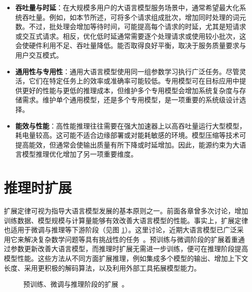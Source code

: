 \begin{itemize}
\item \vspace{0.5em} \textbf{吞吐量与时延}：在大规模多用户的大语言模型服务场景中，通常希望最大化系统吞吐量。例如，如本节所述，可将多个请求组成批次，增加同时处理的词元数。不过，批处理会增加等待时间，可能提高每个请求的时延，尤其是短请求或交互式请求。相反，优化低时延通常需要逐个处理请求或使用较小批次，这会使硬件利用不足、吞吐量降低。能否取得良好平衡，取决于服务质量要求与用户交互模式。
\item \vspace{0.3cm} \textbf{通用性与专用性}：通用大语言模型使用同一组参数学习执行广泛任务。尽管灵活，它们在特定任务上的效率或准确率可能较低。专用模型可在目标应用中提供更好的性能与更低的推理成本，但维护多个专用模型会增加系统复杂度与存储需求。维护单个通用模型，还是多个专用模型，是一项重要的系统级设计选择。
\item \vspace{0.3em} \textbf{能效与性能}：高性能推理往往需要在强大加速器上以高吞吐量运行大型模型，耗电量较高。这可能不适合边缘部署或对能耗敏感的环境。模型压缩等技术可提高能效，但通常会使输出质量有所下降或时延增加。因此，能源约束为大语言模型推理优化增加了另一项重要维度。
\end{itemize}
\vspace{0.5em}


\section{推理时扩展}

扩展定律可视为指导大语言模型发展的基本原则之一。前面各章曾多次讨论，增加训练数据、模型规模与计算量能够有效改善大语言模型的性能。事实上，扩展定律也适用于微调与推理等下游阶段（见图 \ref{fig:scaling-laws-for-llm-development}）。这里讨论，近期大语言模型已广泛采用它来解决复杂数学问题等具有挑战性的任务~\cite{snell-etal:2025scaling}。预训练与微调阶段的扩展着重通过参数更新改善大语言模型，而推理时扩展无需进一步训练，便可在推理阶段提高模型性能。这些方法从不同方面扩展推理，例如集成多个模型的输出、增加上下文长度、采用更积极的解码算法，以及利用外部工具拓展模型能力。

\begin{figure}[!t]
\centering

\vspace{-0.5cm} \caption{预训练、微调与推理阶段的扩展~\cite{briski:2025how}。}
\label{fig:scaling-laws-for-llm-development}
\end{figure}

